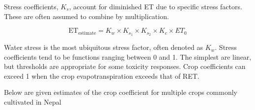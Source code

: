 \documentclass[
  openany]{book}
\begin{document}
Stress coefficients, \(K_s\), account for diminished ET due to specific stress factors. These are often assumed to combine by multiplication.

\[
\mathrm{ET_{estimate}} = K_w \times K_{s_1} \times K_{s_2} \times K_c \times ET_0
\]

Water stress is the most ubiquitous stress factor, often denoted as \(K_w\). Stress coefficients tend to be functions ranging between 0 and 1. The simplest are linear, but thresholds are appropriate for some toxicity responses. Crop coefficients can exceed 1 when the crop evapotranspiration exceeds that of RET.

Below are given estimates of the crop coefficient for multiple crops commonly cultivated in Nepal

\begin{landscape}\begin{table}


\end{table}
\end{landscape}
\end{document}
